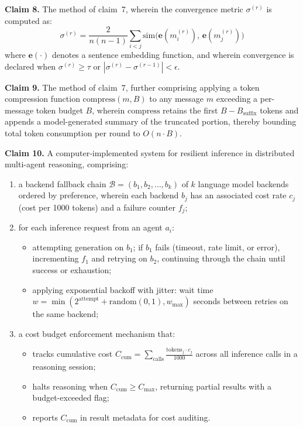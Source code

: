 \documentclass[a4paper,12pt]{article}
\begin{document}
\bigskip

\noindent\textbf{Claim 8.} The method of claim~7, wherein the convergence metric $\sigma^{(r)}$ is computed as:
$$\sigma^{(r)} = \frac{2}{n(n-1)} \sum_{i<j} \mathrm{sim}\bigl(\mathbf{e}(m_i^{(r)}),\, \mathbf{e}(m_j^{(r)})\bigr)$$
where $\mathbf{e}(\cdot)$ denotes a sentence embedding function, and wherein convergence is declared when $\sigma^{(r)} \geq \tau$ or $|\sigma^{(r)} - \sigma^{(r-1)}| < \epsilon$.

\bigskip

\noindent\textbf{Claim 9.} The method of claim~7, further comprising applying a token compression function $\mathrm{compress}(m, B)$ to any message $m$ exceeding a per-message token budget $B$, wherein $\mathrm{compress}$ retains the first $B - B_{\mathrm{suffix}}$ tokens and appends a model-generated summary of the truncated portion, thereby bounding total token consumption per round to $O(n \cdot B)$.

\bigskip


\noindent\textbf{Claim 10.} A computer-implemented system for resilient inference in distributed multi-agent reasoning, comprising:

\begin{enumerate}[label=(\alph*),nosep,leftmargin=2em]
\item a backend fallback chain $\mathcal{B} = (b_1, b_2, \ldots, b_k)$ of $k$ language model backends ordered by preference, wherein each backend $b_j$ has an associated cost rate $c_j$ (cost per 1000 tokens) and a failure counter $f_j$;
\item for each inference request from an agent $a_i$:
  \begin{itemize}[nosep,leftmargin=1.5em]
  \item attempting generation on $b_1$; if $b_1$ fails (timeout, rate limit, or error), incrementing $f_1$ and retrying on $b_2$, continuing through the chain until success or exhaustion;
  \item applying exponential backoff with jitter: wait time $w = \min(2^{\text{attempt}} + \mathrm{random}(0, 1), w_{\max})$ seconds between retries on the same backend;
  \end{itemize}
\item a cost budget enforcement mechanism that:
  \begin{itemize}[nosep,leftmargin=1.5em]
  \item tracks cumulative cost $C_{\mathrm{cum}} = \sum_{\text{calls}} \frac{\text{tokens}_j \cdot c_j}{1000}$ across all inference calls in a reasoning session;
  \item halts reasoning when $C_{\mathrm{cum}} \geq C_{\max}$, returning partial results with a budget-exceeded flag;
  \item reports $C_{\mathrm{cum}}$ in result metadata for cost auditing.
  \end{itemize}
\end{enumerate}
\end{document}

